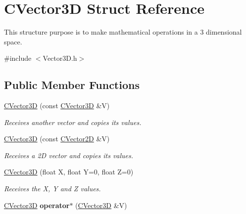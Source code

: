 \hypertarget{struct_c_vector3_d}{}\section{C\+Vector3D Struct Reference}
\label{struct_c_vector3_d}


This structure purpose is to make mathematical operations in a 3 dimensional space.  




{\ttfamily \#include $<$Vector3\+D.\+h$>$}

\subsection*{Public Member Functions}
\begin{DoxyCompactItemize}
\item 
\hyperlink{struct_c_vector3_d_ad1a47efaa268e397799f055a30392d12}{C\+Vector3D} (const \hyperlink{struct_c_vector3_d}{C\+Vector3D} \&V)\hypertarget{struct_c_vector3_d_ad1a47efaa268e397799f055a30392d12}{}\label{struct_c_vector3_d_ad1a47efaa268e397799f055a30392d12}

\begin{DoxyCompactList}\small\item\em Receives another vector and copies its values. \end{DoxyCompactList}\item 
\hyperlink{struct_c_vector3_d_ad794ea4f5d02443712d82ae92fed75ce}{C\+Vector3D} (const \hyperlink{struct_c_vector2_d}{C\+Vector2D} \&V)\hypertarget{struct_c_vector3_d_ad794ea4f5d02443712d82ae92fed75ce}{}\label{struct_c_vector3_d_ad794ea4f5d02443712d82ae92fed75ce}

\begin{DoxyCompactList}\small\item\em Receives a 2D vector and copies its values. \end{DoxyCompactList}\item 
\hyperlink{struct_c_vector3_d_a096691230c3adcf8f5d3c8394797b2a8}{C\+Vector3D} (float X, float Y=0, float Z=0)\hypertarget{struct_c_vector3_d_a096691230c3adcf8f5d3c8394797b2a8}{}\label{struct_c_vector3_d_a096691230c3adcf8f5d3c8394797b2a8}

\begin{DoxyCompactList}\small\item\em Receives the X, Y and Z values. \end{DoxyCompactList}\item 
\hyperlink{struct_c_vector3_d}{C\+Vector3D} {\bfseries operator$\ast$} (\hyperlink{struct_c_vector3_d}{C\+Vector3D} \&V)\hypertarget{struct_c_vector3_d_a17ff340e842237b4c06c47941869cc46}{}\label{struct_c_vector3_d_a17ff340e842237b4c06c47941869cc46}


\end{DoxyCompactItemize}
